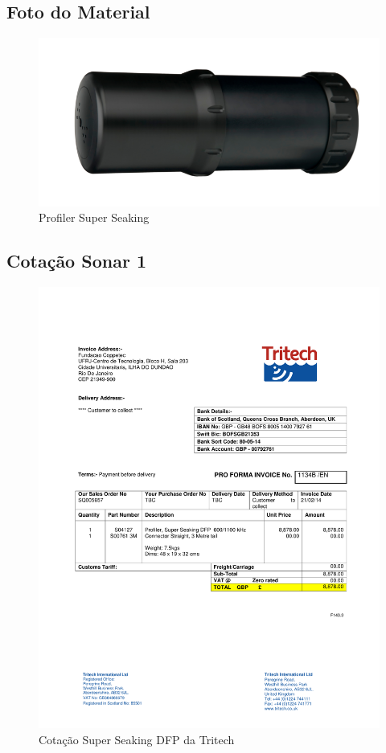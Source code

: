 \newpage

\subsection{Foto do Material}
\begin{figure}[H]
 \centering
 \includegraphics[width=1\columnwidth]{Seaking_Profiler/foto.pdf}
 \caption{Profiler Super Seaking}
\end{figure}

\subsection{Cotação Sonar 1 }
\begin{figure}[H]
 \centering
 \includegraphics[width=1\columnwidth]{Seaking_profiler/price_quote_0.pdf}
 \caption{Cotação Super Seaking DFP da Tritech}
\end{figure}

